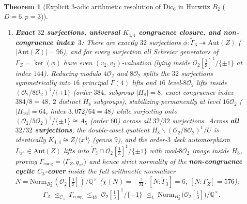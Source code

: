 \documentclass[11pt]{amsart}
\numberwithin{equation}{section}
\theoremstyle{plain}
\newtheorem{theorem}{Theorem}[section]
\theoremstyle{definition}\newtheorem{definition}[theorem]{Definition}
\theoremstyle{remark}\newtheorem{remark}[theorem]{Remark}
\newcommand{\Q}{\mathbb{Q}}
\newcommand{\calO}{\mathcal{O}}
\newcommand{\Aut}{\mathrm{Aut}}
\begin{document}
\begin{theorem}[Explicit $3$-adic arithmetic resolution of $\mathrm{Dic}_6$ in Hurwitz $B_2$ ($D{=}6, p{=}3$)]
\begin{enumerate}[label=(\alph*),nosep]
\item \textbf{Exact $32$ surjections, universal $K_{4,4}$ congruence closure, and non-congruence index~$3$:} There are exactly $32$ surjections $\phi:\tilde{\Gamma}_3\twoheadrightarrow\Aut(Z)$ ($|\Aut(Z)|=96$), and for every surjection all Schreier generators of $\Gamma_Z=\ker(\phi)$ have even $(v_2,v_3)$-valuation (lying inside $\calO_2[\frac13]^1/\{\pm 1\}$ at index $144$). Reducing modulo $4\calO_2$ and $8\calO_2$ splits the $32$ surjections symmetrically into $16$ principal $\Gamma(4)$ lifts and $16$ level-$8\calO_2$ lifts inside $(\calO_2/8\calO_2)^1/\{\pm 1\}$ (order $384$, subgroup $|H_8|=8$, exact congruence index $384/8=48$, $2$ distinct $H_8$ subgroups), stabilizing permanently at level $16\calO_2$ ($|H_{16}|=64$, index $3{,}072/64=48$) while surjecting onto $(\calO_2/5\calO_2)^1/\{\pm 1\}\cong A_5$ (order $60$) across all $32/32$ surjections. Across \textbf{all $32/32$ surjections}, the double-coset quotient $H_8\backslash(\calO_2/8\calO_2)^1/U$ is identically $K_{4,4}\cong Z/\langle x^4\rangle$ (genus $9$), and the order-$3$ deck automorphism $L_{x^4}\in\Aut(Z)$ lifts into $\tilde{\Gamma}_3\cap\calO_2[\frac13]^1/\{\pm 1\}$ with mod-$8\calO_2$ image inside $H_8$, proving $\Gamma_{\mathrm{cong}}=\langle\Gamma_Z,q_{x^4}\rangle$ and hence strict normality of the \textbf{non-congruence cyclic $C_3$-cover} inside the full arithmetic normalizer $N=\mathrm{Norm}_{B_2^\times}(\calO_2[\tfrac13])/\Q^\times$ ($\chi(N)=-\tfrac{1}{24}$, $[N:\tilde{\Gamma}_3]=6$, $[N:\Gamma_Z]=576$):
\begin{equation}\label{eq:tower_b2}
\Gamma_Z \;\trianglelefteq_{C_3}\; \Gamma_{\mathrm{cong}} \;\le_{48}\; \calO_2[\tfrac13]^1/\{\pm 1\} \;\trianglelefteq_4\; \mathrm{Norm}_{B_2^\times}\bigl(\calO_2[\tfrac13]\bigr)/\Q^\times.
\end{equation}
\end{enumerate}
\end{theorem}
\end{document}
